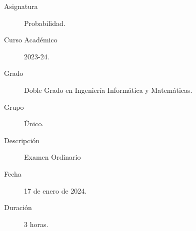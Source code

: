 \documentclass[12pt]{article}
\begin{document}

    
    

    \begin{description}
        \item[Asignatura] Probabilidad.
        \item[Curso Académico] 2023-24.
        \item[Grado] Doble Grado en Ingeniería Informática y Matemáticas.
        \item[Grupo] Único.
        \item[Descripción] Examen Ordinario 
        \item[Fecha] 17 de enero de 2024.
        \item[Duración] 3 horas.
    
    \end{description}
    \newpage
\end{document}
